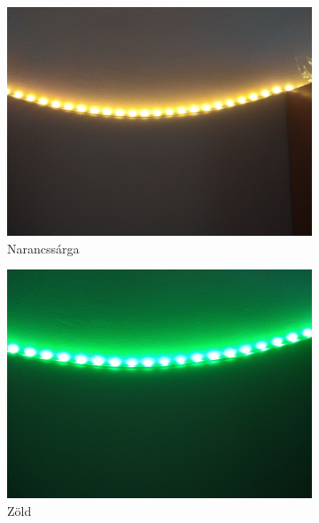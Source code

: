 \documentclass[12pt]{extarticle}
\begin{document}
	\begin{figure}[h!]
		\centering
		\begin{subfigure}[b]{0.3\linewidth}
			\includegraphics[width=\linewidth]{sarga.jpg}
			\caption{Narancssárga}
		\end{subfigure}
		\begin{subfigure}[b]{0.3\linewidth}
			\includegraphics[width=\linewidth]{zold.jpg}
			\caption{Zöld}
		\end{subfigure}
		\begin{subfigure}[b]{0.3\linewidth}

\end{subfigure}
\end{figure}
\end{document}
